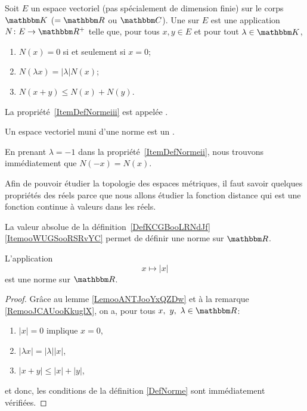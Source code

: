 \begin{definition}  \label{DefNorme}	\label{DefEVNetDistance}
    Soit \( E\) un espace vectoriel (pas spécialement de dimension finie) sur le corps \( \eK\) (\( =\eR\) ou \( \eC\)). Une   sur $E$ est une application $N\colon E\to \eR^+$ telle que, pour tous $x,y\in E$ et pour tout $\lambda\in\eK$,
	\begin{enumerate}
		\item
            \( N(x)=0\) si et seulement si \( x=0\);
		\item\label{ItemDefNormeii}
			$N(\lambda x)=| \lambda | N(x)$;
		\item\label{ItemDefNormeiii}
			$N(x+y)\leq N(x)+N(y)$.
	\end{enumerate}
    
    La propriété~\ref{ItemDefNormeiii} est appelée .

    Un espace vectoriel muni d'une norme est un .
\end{definition}
En prenant $\lambda=-1$ dans la propriété~\ref{ItemDefNormeii}, nous trouvons immédiatement que $N(-x)=N(x)$.

Afin de pouvoir étudier la topologie des espaces métriques, il faut savoir quelques propriétés des réels parce que nous allons étudier la fonction distance qui est une fonction continue à valeurs dans les réels.

La valeur absolue de la définition~\ref{DefKCGBooLRNdJf}\ref{ItemooWUGSooRSRvYC} permet de définir une norme sur \( \eR\).
\begin{lemma}
    L'application
    \begin{equation}
         x\mapsto | x |
    \end{equation}
     est une norme sur $\eR$.
\end{lemma}

\begin{proof}
  Grâce au lemme \ref{LemooANTJooYxQZDw} et à la remarque \ref{RemooJCAUooKkuglX}, on a, pour tous \(x,\ y,\ \lambda \in \eR \):
\begin{enumerate}
\item $| x |=0$ implique $x=0$,
\item $| \lambda x |=| \lambda | |x |$,
\item $| x+y |\leq | x |+| y |$,
\end{enumerate}
et donc, les conditions de la définition \ref{DefNorme} sont immédiatement vérifiées.
\end{proof}


